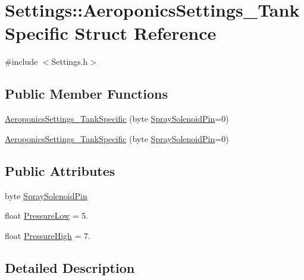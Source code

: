\hypertarget{struct_settings_1_1_aeroponics_settings___tank_specific}{}\section{Settings\+:\+:Aeroponics\+Settings\+\_\+\+Tank\+Specific Struct Reference}
\label{struct_settings_1_1_aeroponics_settings___tank_specific}


{\ttfamily \#include $<$Settings.\+h$>$}

\subsection*{Public Member Functions}
\begin{DoxyCompactItemize}
\item 
\hyperlink{struct_settings_1_1_aeroponics_settings___tank_specific_a1cd83b95ffd240785ccba3da6c75f46b}{Aeroponics\+Settings\+\_\+\+Tank\+Specific} (byte \hyperlink{struct_settings_1_1_aeroponics_settings___tank_specific_a622a767a391bbed1dab66c80d18259b7}{Spray\+Solenoid\+Pin}=0)
\item 
\hyperlink{struct_settings_1_1_aeroponics_settings___tank_specific_a1cd83b95ffd240785ccba3da6c75f46b}{Aeroponics\+Settings\+\_\+\+Tank\+Specific} (byte \hyperlink{struct_settings_1_1_aeroponics_settings___tank_specific_a622a767a391bbed1dab66c80d18259b7}{Spray\+Solenoid\+Pin}=0)
\end{DoxyCompactItemize}
\subsection*{Public Attributes}
\begin{DoxyCompactItemize}
\item 
byte \hyperlink{struct_settings_1_1_aeroponics_settings___tank_specific_a622a767a391bbed1dab66c80d18259b7}{Spray\+Solenoid\+Pin}
\item 
float \hyperlink{struct_settings_1_1_aeroponics_settings___tank_specific_a688d9d2d8de2c625796a1c478127088d}{Pressure\+Low} = 5.
\item 
float \hyperlink{struct_settings_1_1_aeroponics_settings___tank_specific_a746cf69d14732b854404e17fd1069cfd}{Pressure\+High} = 7.
\end{DoxyCompactItemize}


\subsection{Detailed Description}


